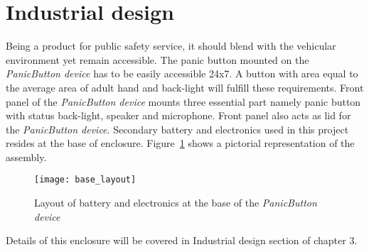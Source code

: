 

\section{Industrial design}
Being a product for public safety service, it should blend with the vehicular environment yet remain accessible. The panic button mounted on the \emph{PanicButton device} has to be easily accessible 24x7. A button with area equal to the average area of adult hand and back-light will fulfill these requirements. Front panel of the \emph{PanicButton device} mounts three essential part namely panic button with status back-light, speaker and microphone. Front panel also acts as lid for the \emph{PanicButton device}. Secondary battery and electronics used in this project resides at the base of enclosure. Figure~\ref{fig:baselayout} shows a pictorial representation of the assembly.

\begin{figure}[H]
\centering
\texttt{[image: base\_layout]}
\caption{Layout of battery and electronics at the base of the \emph{PanicButton device}}
\label{fig:baselayout}
\end{figure}  

Details of this enclosure will be covered in Industrial design section of chapter 3.




